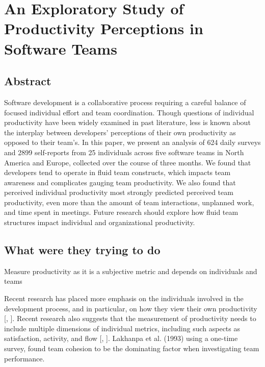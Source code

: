 \section{An Exploratory Study of Productivity Perceptions in Software Teams}

\subsection{Abstract}

Software development is a collaborative process requiring a careful balance of focused individual effort and team coordination. Though questions of individual productivity have been widely examined in past literature, less is known about the interplay between developers’ perceptions of their own productivity as opposed to their team’s. In this paper, we present an analysis of 624 daily surveys and 2899 self-reports from 25 individuals across five software teams in North America and Europe, collected over the course of three months. We found that developers tend to operate in fluid team constructs, which impacts team awareness and complicates gauging team productivity. We also found that perceived individual productivity most strongly predicted perceived team productivity, even more than the amount of team interactions, unplanned work, and time spent in meetings. Future research should explore how fluid team structures impact individual and organizational productivity.

\subsection{What were they trying to do}

Measure productivity as it is a subjective metric and depends on individuals and teams

Recent research has placed more emphasis on the individuals involved in the development process, and in particular, on how they view their own productivity [\cite{koWhyWeShould2019}, \cite{meyerSoftwareDevelopersPerceptions2014}]. Recent research also suggests that the measurement of productivity needs to include multiple dimensions of individual metrics, including such aspects as satisfaction, activity, and flow [\cite{kimUnderstandingPersonalProductivity2019}, \cite{markNeuroticsCanFocus2016}]. Lakhanpa et al. (1993) \cite{lakhanpalUnderstandingFactorsInfluencing1993} using a one-time survey, found team cohesion to be the dominating factor when investigating team performance.

